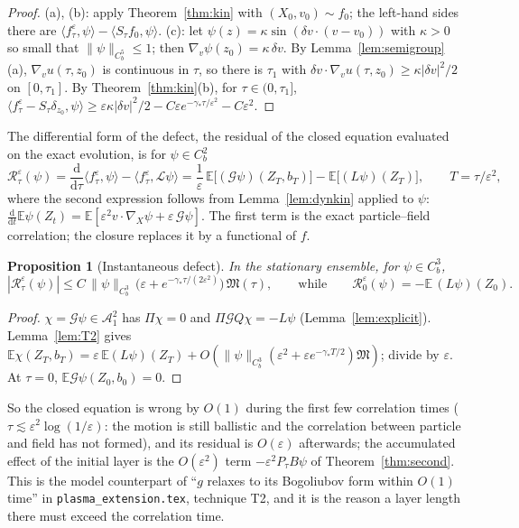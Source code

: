 \documentclass[11pt]{article}
\newcommand{\dd}{\mathrm{d}}
\newcommand{\E}{\mathbb{E}}
\newcommand{\eps}{\varepsilon}
\newcommand{\cL}{\mathcal{L}}
\newcommand{\cG}{\mathcal{G}}
\newcommand{\cA}{\mathcal{A}}
\newcommand{\cR}{\mathcal{R}}
\newcommand{\fM}{\mathfrak{M}}
\newcommand{\nrm}[2]{\|#1\|_{#2}}
\newtheorem{proposition}[theorem]{Proposition}
\theoremstyle{remark}
\begin{document}
\begin{proof}
(a), (b): apply Theorem~\ref{thm:kin} with $(X_0,v_0)\sim f_0$; the
left-hand sides there are $\langle f^\eps_\tau,\psi\rangle-\langle S_\tau
f_0,\psi\rangle$. (c): let $\psi(z)=\kappa\sin(\delta v\cdot(v-v_0))$ with
$\kappa>0$ so small that $\nrm{\psi}{C_b^5}\le1$; then
$\nabla_v\psi(z_0)=\kappa\,\delta v$. By Lemma~\ref{lem:semigroup}(a),
$\nabla_vu(\tau,z_0)$ is continuous in $\tau$, so there is $\tau_1$ with
$\delta v\cdot\nabla_vu(\tau,z_0)\ge\kappa|\delta v|^2/2$ on $[0,\tau_1]$.
By Theorem~\ref{thm:kin}(b), for $\tau\in(0,\tau_1]$,
$\langle f^\eps_\tau-S_\tau\delta_{z_0},\psi\rangle\ge
\eps\kappa|\delta v|^2/2-C\eps e^{-\gamma_*\tau/\eps^2}-C\eps^2$.
\end{proof}

The differential form of the defect, the residual of the closed equation
evaluated on the exact evolution, is for $\psi\in C_b^2$
\begin{equation}
  \cR^\eps_\tau(\psi)=\frac{\dd}{\dd\tau}\langle f^\eps_\tau,\psi\rangle
    -\langle f^\eps_\tau,\cL\psi\rangle
  =\frac1\eps\,\E\bigl[(\cG\psi)(Z_T,b_T)\bigr]-\E\bigl[(L\psi)(Z_T)\bigr],
  \qquad T=\tau/\eps^2,
  \label{eq:resid}
\end{equation}
where the second expression follows from Lemma~\ref{lem:dynkin} applied to
$\psi$: $\frac{\dd}{\dd t}\E\psi(Z_t)=\E[\eps^2v\cdot\nabla_X\psi
+\eps\,\cG\psi]$. The first term is the exact particle--field correlation;
the closure replaces it by a functional of $f$.

\begin{proposition}[Instantaneous defect]\label{prop:inst}
In the stationary ensemble, for $\psi\in C_b^3$,
\[
  |\cR^\eps_\tau(\psi)|\le C\,\nrm{\psi}{C_b^3}\,
  \bigl(\eps+e^{-\gamma_*\tau/(2\eps^2)}\bigr)\,\fM(\tau),
  \qquad\text{while}\qquad
  \cR^\eps_0(\psi)=-\E\,(L\psi)(Z_0).
\]
\end{proposition}

\begin{proof}
$\chi=\cG\psi\in\cA_1^2$ has $\Pi\chi=0$ and $\Pi\cG Q\chi=-L\psi$
(Lemma~\ref{lem:explicit}). Lemma~\ref{lem:T2} gives
$\E\chi(Z_T,b_T)=\eps\,\E(L\psi)(Z_T)+O(\nrm{\psi}{C_b^3}(\eps^2+\eps
e^{-\gamma_*T/2})\fM)$; divide by $\eps$. At $\tau=0$, $\E\cG\psi(Z_0,b_0)=0$.
\end{proof}

So the closed equation is wrong by $O(1)$ during the first few correlation
times ($\tau\lesssim\eps^2\log(1/\eps)$: the motion is still ballistic and
the correlation between particle and field has not formed), and its
residual is $O(\eps)$ afterwards; the accumulated effect of the initial
layer is the $O(\eps^2)$ term $-\eps^2P_\tau B\psi$ of
Theorem~\ref{thm:second}. This is the model counterpart of ``$g$ relaxes to
its Bogoliubov form within $O(1)$ time'' in \texttt{plasma\_extension.tex},
technique T2, and it is the reason a layer length there must exceed the
correlation time.
\end{document}
